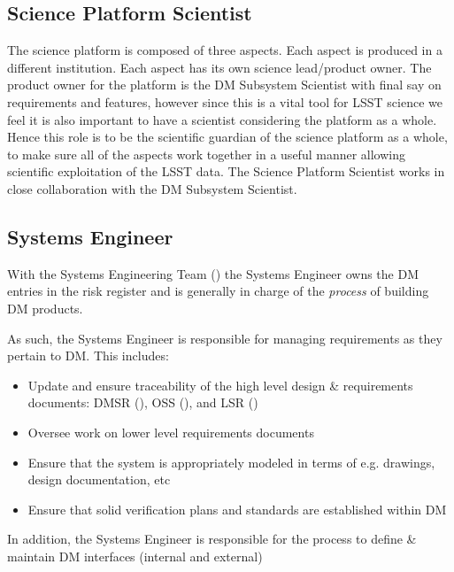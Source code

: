 \subsection{Science Platform Scientist \label{role:scip}}
The science platform is composed of three aspects. Each aspect is produced in a different institution.
Each aspect has its own science lead/product owner.
The product owner for the platform is the \gls{DM} \gls{Subsystem Scientist}  with final say on requirements and features, however since this is a vital tool for \gls{LSST} science we feel it is also important to have a scientist considering the platform as a whole.
Hence this role is to be the scientific guardian of the science platform as a whole, to make sure all of the aspects work together in a useful manner allowing scientific exploitation of the \gls{LSST} data. The \gls{Science Platform} Scientist works in close collaboration with the \gls{DM} \gls{Subsystem Scientist}.

\subsection{Systems Engineer \label{role:sysengineer}}

With the \gls{Systems Engineering} Team () the \gls{Systems Engineer} owns the \gls{DM} entries in the risk register and is generally in charge of the \textit{process} of building \gls{DM} products.

As such, the \gls{Systems Engineer} is responsible for managing requirements as they pertain to \gls{DM}.
This includes:

\begin{itemize}
\item Update and ensure traceability of the high level design \& requirements documents: \gls{DMSR} (), \gls{OSS} (), and \gls{LSR} ()
\item Oversee work on lower level requirements documents
\item Ensure  that the system is appropriately modeled in terms of e.g. drawings, design documentation, etc
\item Ensure  that solid verification plans and standards are established within \gls{DM}
\end{itemize}

In addition, the \gls{Systems Engineer} is responsible for the process to define \& maintain \gls{DM} interfaces (internal and external)

